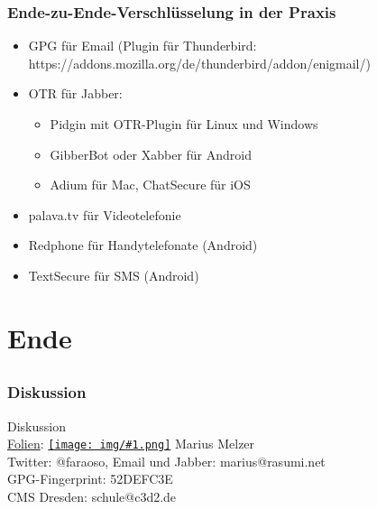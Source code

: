 \documentclass[12pt]{beamer}
\newcommand{\cc}[1]{\texttt{[image: img/\#1.png]}\hspace{1mm}}
\begin{document}
\begin{frame}
    \frametitle{Ende-zu-Ende-Verschlüsselung in der Praxis}
    \begin{itemize}
      \item<2-> GPG für Email (Plugin für Thunderbird: https://addons.mozilla.org/de/thunderbird/addon/enigmail/)
      \item<3-> OTR für Jabber:
        \begin{itemize}
          \item Pidgin mit OTR-Plugin für Linux und Windows
          \item GibberBot oder Xabber für Android
          \item Adium für Mac, ChatSecure für iOS
        \end{itemize}
      \item<4-> palava.tv für Videotelefonie
      \item<5-> Redphone für Handytelefonate (Android)
      \item<6-> TextSecure für SMS (Android)
    \end{itemize}
\end{frame}

\section{Ende}
\subsection{}

\begin{frame}
  \frametitle{Diskussion}
  \begin{center}
    {\Large Diskussion}\\
    \vspace{5mm} 
    \href{https://github.com/c3d2/cms-nsa}{Folien}: \href{https://creativecommons.org/licenses/by-sa/4.0/}{\cc{by-sa}} Marius Melzer \\
    \vspace{4mm}
    Twitter: @faraoso, Email und Jabber: marius@rasumi.net\\GPG-Fingerprint: 52DEFC3E\\
    \vspace{4mm}
    CMS Dresden: schule@c3d2.de
  \end{center}
\end{frame}
\end{document}
